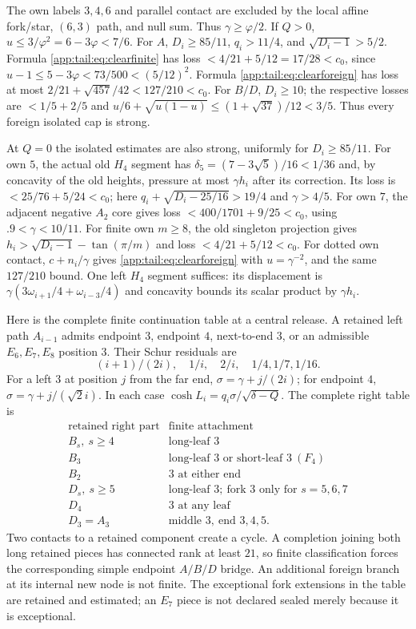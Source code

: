 \documentclass[11pt]{article}
\theoremstyle{definition}
\theoremstyle{remark}
\newcommand{\ph}{\varphi}
\begin{document}
The own labels $3,4,6$ and parallel contact are excluded by the
local affine fork/star, $(6,3)$ path, and null sum. Thus
$\gamma\ge\ph/2$. If $Q>0$, $u\le3/\ph^2=6-3\ph<7/6$.
For $A$, $D_i\ge85/11$, $q_i>11/4$, and
$\sqrt{D_i-1}>5/2$. Formula \eqref{app:tail:eq:clearfinite} has loss
$<4/21+5/12=17/28<c_0$, since
$u-1\le5-3\ph<73/500<(5/12)^2$.
Formula \eqref{app:tail:eq:clearforeign} has loss at most
$2/21+\sqrt{457}/42<127/210<c_0$.
For $B/D$, $D_i\ge10$; the respective losses are
$<1/5+2/5$ and
$u/6+\sqrt{u(1-u)}\le(1+\sqrt{37})/12<3/5$.
Thus every foreign isolated cap is strong.

At $Q=0$ the isolated estimates are also strong, uniformly for
$D_i\ge85/11$. For own $5$, the actual old $H_4$ segment has
$\delta_5=(7-3\sqrt5)/16<1/36$ and, by concavity of the old
heights, pressure at most $\gamma h_i$ after its correction.
Its loss is $<25/76+5/24<c_0$; here
$q_i+\sqrt{D_i-25/16}>19/4$ and $\gamma>4/5$.
For own $7$, the adjacent negative $A_2$ core gives loss
$<400/1701+9/25<c_0$, using $.9<\gamma<10/11$.
For finite own $m\ge8$, the old singleton projection gives
$h_i>\sqrt{D_i-1}-\tan(\pi/m)$ and loss
$<4/21+5/12<c_0$.
For dotted own contact, $c+n_i/\gamma$ gives
\eqref{app:tail:eq:clearforeign} with $u=\gamma^{-2}$, and the same
$127/210$ bound. One left $H_4$ segment suffices: its displacement
is $\gamma(3\omega_{i+1}/4+\omega_{i-3}/4)$ and concavity
bounds its scalar product by $\gamma h_i$.

Here is the complete finite continuation table at a central release.
A retained left path $A_{i-1}$ admits endpoint $3$, endpoint $4$,
next-to-end $3$, or an admissible $E_6,E_7,E_8$ position $3$.
Their Schur residuals are
\begin{equation}\label{app:tail:eq:leftresiduals}
 (i+1)/(2i),\quad1/i,\quad2/i,\quad1/4,1/7,1/16.
\end{equation}
For a left $3$ at position $j$ from the far end,
$\sigma=\gamma+j/(2i)$; for endpoint $4$,
$\sigma=\gamma+j/(\sqrt2 i)$. In each case
$\cosh L_i=q_i\sigma/\sqrt{\delta-Q}$.
The complete right table is
\[
\begin{array}{c|l}
\text{retained right part}&\text{finite attachment}\\ \hline
B_s,\ s\ge4&\text{long-leaf }3\\
B_3&\text{long-leaf }3\text{ or short-leaf }3\ (F_4)\\
B_2&3\text{ at either end}\\
D_s,\ s\ge5&\text{long-leaf }3;\ \text{fork }3\text{ only for }s=5,6,7\\
D_4&3\text{ at any leaf}\\
D_3=A_3&\text{middle }3,\ \text{end }3,4,5 .
\end{array}
\]
Two contacts to a retained component create a cycle. A completion
joining both long retained pieces has connected rank at least $21$,
so finite classification forces the corresponding simple endpoint
$A/B/D$ bridge. An additional foreign branch at its internal new
node is not finite. The exceptional fork extensions in the table
are retained and estimated; an $E_7$ piece is not declared sealed
merely because it is exceptional.
\end{document}
